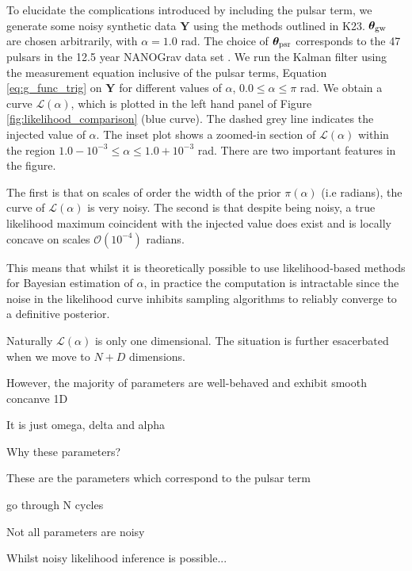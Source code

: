 \documentclass[fleqn,usenatbib,useAMS]{mnras}
\begin{document}
To elucidate the complications introduced by including the pulsar term, we generate some noisy synthetic data $\boldsymbol{Y}$ using the methods outlined in K23. $\boldsymbol{\theta}_{\rm gw}$ are chosen arbitrarily, with $\alpha = 1.0 $ rad.
The choice of $\boldsymbol{\theta}_{\rm psr}$ corresponds to the 47 pulsars in the 12.5 year NANOGrav data set  \citep{2020ApJ...905L..34A}. We run the Kalman filter using the measurement equation inclusive of the pulsar terms, Equation \eqref{eq:g_func_trig} on $\boldsymbol{Y}$ for different values of $\alpha$, $ 0.0 \le \alpha \le \pi$ rad. We obtain a curve $\mathcal{L}(\alpha)$, which is plotted in the left hand panel of Figure \ref{fig:likelihood_comparison} (blue curve). The dashed grey line indicates the injected value of $\alpha$. The inset plot shows a zoomed-in section of $\mathcal{L}(\alpha)$ within the region $ 1.0 - 10^{-3} \le \alpha \le 1.0 +10^{-3}$ rad. There are two important features in the figure. 



The first is that on scales of order the width of the prior $\pi(\alpha)$ (i.e radians), the curve of $\mathcal{L}(\alpha)$ is very noisy. The second is that despite being noisy, a true likelihood maximum coincident with the injected value does exist and is locally concave on scales $\mathcal{O} \left( 10^{-4}\right)$ radians.



This means that whilst it is theoretically possible to use likelihood-based methods for Bayesian estimation of $\alpha$, in practice the computation is intractable since the noise in the likelihood curve inhibits sampling algorithms to reliably converge to a definitive posterior.


Naturally $\mathcal{L}(\alpha)$ is only one dimensional. The situation is further esacerbated when we move to $N +D $ dimensions. 


However, the majority of parameters are well-behaved and exhibit smooth concanve 1D


It is just omega, delta and alpha


Why these parameters? 

These are the parameters which correspond to the pulsar term


go through N cycles

Not all parameters are noisy




Whilst noisy likelihood inference is possible...
\end{document}

